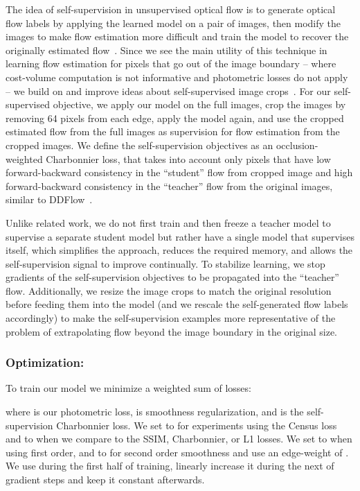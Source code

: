 \documentclass[runningheads]{llncs}
\begin{document}
 The idea of self-supervision in unsupervised optical flow is to generate optical flow labels by applying the learned model on a pair of images, then modify the images to make flow estimation more difficult and train the model to recover the originally estimated flow~\cite{DDFlow,SelFlow}. Since we see the main utility of this technique in learning flow estimation for pixels that go out of the image boundary -- where cost-volume computation is not informative and photometric losses do not apply -- we build on and improve ideas about self-supervised image crops~\cite{DDFlow}. 
For our self-supervised objective, we apply our model on the full images, crop the images by removing 64 pixels from each edge, apply the model again, and use the cropped estimated flow from the full images as supervision for flow estimation from the cropped images. We define the self-supervision objectives as an occlusion-weighted Charbonnier loss, that takes into account only pixels that have low forward-backward consistency in the ``student'' flow from cropped image and high forward-backward consistency in the ``teacher'' flow from the original images, similar to DDFlow~\cite{DDFlow}.

 Unlike related work, we do not first train and then freeze a teacher model to supervise a separate student model but rather have a single model that supervises itself, which simplifies the approach, reduces the required memory, and allows the self-supervision signal to improve continually. To stabilize learning, we stop gradients of the self-supervision objectives to be propagated into the ``teacher'' flow. Additionally, we resize the image crops to match the original resolution before feeding them into the model (and we rescale the self-generated flow labels accordingly) to make the self-supervision examples more representative of the problem of extrapolating flow beyond the image boundary in the original size.

\subsubsection{Optimization:}

To train our model  we minimize a weighted sum of losses:

where  is our photometric loss,  is smoothness regularization, and  is the self-supervision Charbonnier loss. 
We set  to  for experiments using the Census loss and to  when we compare to the SSIM, Charbonnier, or L1 losses. We set  to  when using first order, and to  for second order smoothness and use an edge-weight of . We use  during the first half of training, linearly increase it  during the next  of gradient steps and keep it constant afterwards.
\end{document}
